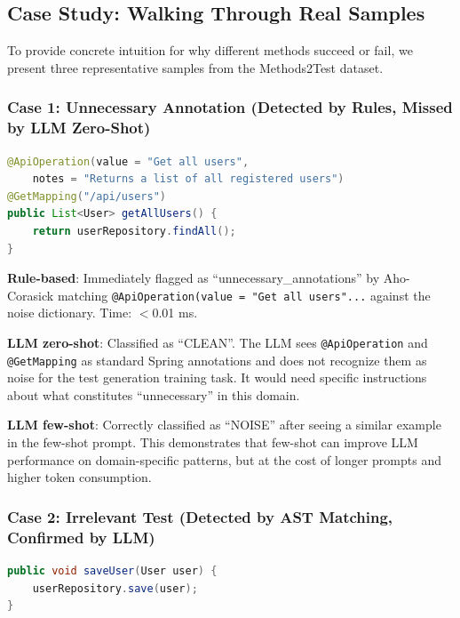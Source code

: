 \documentclass[acmlarge,nonacm,screen]{acmart}
\begin{document}
\subsection{Case Study: Walking Through Real Samples}

To provide concrete intuition for why different methods succeed or fail, we present three representative samples from the Methods2Test dataset.

\subsubsection{Case 1: Unnecessary Annotation (Detected by Rules, Missed by LLM Zero-Shot)}

\begin{lstlisting}[language=Java,caption={Case 1: Focal method with @ApiOperation annotation}]
@ApiOperation(value = "Get all users",
    notes = "Returns a list of all registered users")
@GetMapping("/api/users")
public List<User> getAllUsers() {
    return userRepository.findAll();
}
\end{lstlisting}

\textbf{Rule-based}: Immediately flagged as ``unnecessary\_annotations'' by Aho-Corasick matching \texttt{@ApiOperation(value = "Get all users"...} against the noise dictionary. Time: $<$0.01 ms.

\textbf{LLM zero-shot}: Classified as ``CLEAN''. The LLM sees \texttt{@ApiOperation} and \texttt{@GetMapping} as standard Spring annotations and does not recognize them as noise for the test generation training task. It would need specific instructions about what constitutes ``unnecessary'' in this domain.

\textbf{LLM few-shot}: Correctly classified as ``NOISE'' after seeing a similar example in the few-shot prompt. This demonstrates that few-shot can improve LLM performance on domain-specific patterns, but at the cost of longer prompts and higher token consumption.

\subsubsection{Case 2: Irrelevant Test (Detected by AST Matching, Confirmed by LLM)}

\begin{lstlisting}[language=Java,caption={Case 2: Focal method}]
public void saveUser(User user) {
    userRepository.save(user);
}
\end{lstlisting}
\end{document}
